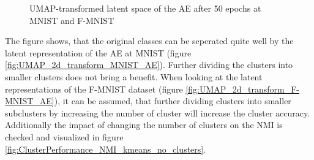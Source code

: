 \documentclass[12pt,DIV14,BCOR12mm,a4paper,footexclude,headinclude,halfparskip-,twoside,openright,cleardoubleempty,idxtotoc,bibtotoc,listtotoc]{scrreprt} %
\numberwithin{equation}{chapter}
\begin{document}
	 \begin{figure}[htb!]
		\centering	
		\qquad
		\caption{UMAP-transformed latent space of the AE after 50 epochs at MNIST and F-MNIST}
		\label{fig:UMAP_2d_transform_MNIST_F-MNIST_AE}
	\end{figure}
The figure shows, that the original classes can be seperated quite well by the latent representation of the AE at MNIST (figure \ref{fig:UMAP_2d_transform_MNIST_AE}). Further dividing the clusters into smaller clusters does not bring a benefit. When looking at the latent representations of the F-MNIST dataset (figure \ref{fig:UMAP_2d_transform_F-MNIST_AE}), it can be assumed, that further dividing clusters into smaller subclusters by increasing the number of cluster will increase the cluster accuracy. Additionally the impact of changing the number of clusters on the NMI is checked and visualized in figure \ref{fig:ClusterPerformance_NMI_kmeans_no_clusters}.
\end{document}
